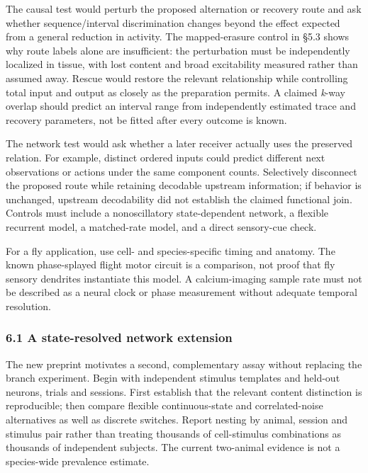 \documentclass[
  american,
  11pt,
  letterpaper,
]{article}
\begin{document}
The causal test would perturb the proposed alternation or recovery route and ask whether sequence/interval discrimination changes beyond the effect expected from a general reduction in activity. The mapped-erasure control in §5.3 shows why route labels alone are insufficient: the perturbation must be independently localized in tissue, with lost content and broad excitability measured rather than assumed away. Rescue would restore the relevant relationship while controlling total input and output as closely as the preparation permits. A claimed \emph{k}-way overlap should predict an interval range from independently estimated trace and recovery parameters, not be fitted after every outcome is known.

The network test would ask whether a later receiver actually uses the preserved relation. For example, distinct ordered inputs could predict different next observations or actions under the same component counts. Selectively disconnect the proposed route while retaining decodable upstream information; if behavior is unchanged, upstream decodability did not establish the claimed functional join. Controls must include a nonoscillatory state-dependent network, a flexible recurrent model, a matched-rate model, and a direct sensory-cue check.

For a fly application, use cell- and species-specific timing and anatomy. The known phase-splayed flight motor circuit is a comparison, not proof that fly sensory dendrites instantiate this model. A calcium-imaging sample rate must not be described as a neural clock or phase measurement without adequate temporal resolution.

\subsubsection{6.1 A state-resolved network extension}\label{a-state-resolved-network-extension}

The new preprint motivates a second, complementary assay without replacing the branch experiment. Begin with independent stimulus templates and held-out neurons, trials and sessions. First establish that the relevant content distinction is reproducible; then compare flexible continuous-state and correlated-noise alternatives as well as discrete switches. Report nesting by animal, session and stimulus pair rather than treating thousands of cell-stimulus combinations as thousands of independent subjects. The current two-animal evidence is not a species-wide prevalence estimate.
\end{document}
